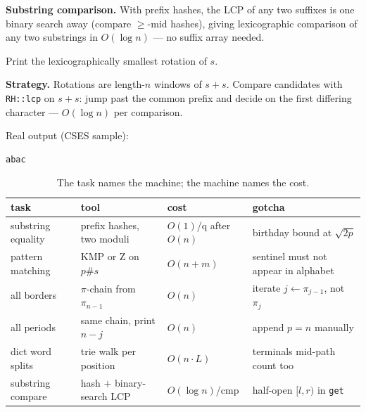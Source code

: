 \textbf{Substring comparison.} With prefix hashes, the LCP of any
two suffixes is one binary search away (compare $\ge$-mid
hashes), giving lexicographic comparison of any two substrings in
$O(\log n)$ --- no suffix array needed.
\begin{example}\label{ex:rotation}
Print the lexicographically smallest rotation of $s$.
\par\smallskip
\textbf{Strategy.} Rotations are length-$n$ windows of $s{+}s$.
Compare candidates with \texttt{RH::lcp} on $s{+}s$: jump past the
common prefix and decide on the first differing character ---
$O(\log n)$ per comparison.
\par\smallskip
\begin{solution}

Real output (CSES sample):
\begin{lstlisting}[numbers=none]
abac
\end{lstlisting}
\end{solution}
\end{example}

\begin{table}[ht]\centering\small
\begin{tabularx}{\linewidth}{l l l X}
\toprule
task & tool & cost & gotcha\\
\midrule
substring equality & prefix hashes, two moduli & $O(1)$/q after $O(n)$ & birthday bound at $\sqrt{2p}$\\
pattern matching & KMP or Z on $p\#s$ & $O(n+m)$ & sentinel must not appear in alphabet\\
all borders & $\pi$-chain from $\pi_{n-1}$ & $O(n)$ & iterate $j\leftarrow\pi_{j-1}$, not $\pi_j$\\
all periods & same chain, print $n-j$ & $O(n)$ & append $p=n$ manually\\
dict word splits & trie walk per position & $O(n\cdot L)$ & terminals mid-path count too\\
substring compare & hash $+$ binary-search LCP & $O(\log n)$/cmp & half-open $[l,r)$ in \texttt{get}\\
\bottomrule
\end{tabularx}
\caption{The task names the machine; the machine names the cost.}
\label{tab:strings}
\end{table}

